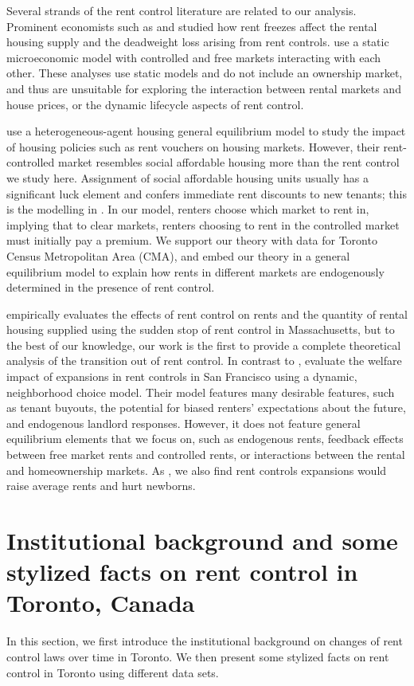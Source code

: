 \documentclass[parskip=full]{article}
\begin{document}
Several strands of the rent control literature are related to our analysis. Prominent economists such as \citet{hayek-1929} and \citet{fs-1946} studied how rent freezes affect the rental housing supply and the deadweight loss arising from rent controls. \citet{fallis-1985} use a static microeconomic model with controlled and free markets interacting with each other. These analyses use static models and do not include an ownership market, and thus are unsuitable for exploring the interaction between rental markets and house prices, or the dynamic lifecycle aspects of rent control.

\citet{fmn-2022} use a heterogeneous-agent housing general equilibrium model to study the impact of housing policies such as rent vouchers on housing markets. However, their rent-controlled market resembles social affordable housing more than the rent control we study here. Assignment of social affordable housing units usually has a significant luck element and confers immediate rent discounts to new tenants; this is the modelling in \citet{fmn-2022}. In our model, renters choose which market to rent in, implying that to clear markets, renters choosing to rent in the controlled market must initially pay a premium. We support our theory with data for Toronto Census Metropolitan Area (CMA), and embed our theory in a general equilibrium model to explain how rents in different markets are endogenously determined in the presence of rent control.

\citet{sims-2007} empirically evaluates the effects of rent control on rents and the quantity of rental housing supplied using the sudden stop of rent control in Massachusetts, but to the best of our knowledge, our work is the first to provide a complete theoretical analysis of the transition out of rent control. In contrast to \citet{sims-2007}, \citet{diamond-2019} evaluate the welfare impact of expansions in rent controls in San Francisco using a dynamic, neighborhood choice model. Their model features many desirable features, such as tenant buyouts, the potential for biased renters' expectations about the future, and endogenous landlord responses. However, it does not feature general equilibrium elements that we focus on, such as endogenous rents, feedback effects between free market rents and controlled rents, or interactions between the rental and homeownership markets. As \citet{diamond-2019}, we also find rent controls expansions would raise average rents and hurt newborns.

\section{Institutional background and some stylized facts on rent control in Toronto, Canada}\label{sec:insitutional_background}
In this section, we first introduce the institutional background on changes of rent control laws over time in Toronto. We then present some stylized facts on rent control in Toronto using different data sets. 
\end{document}
